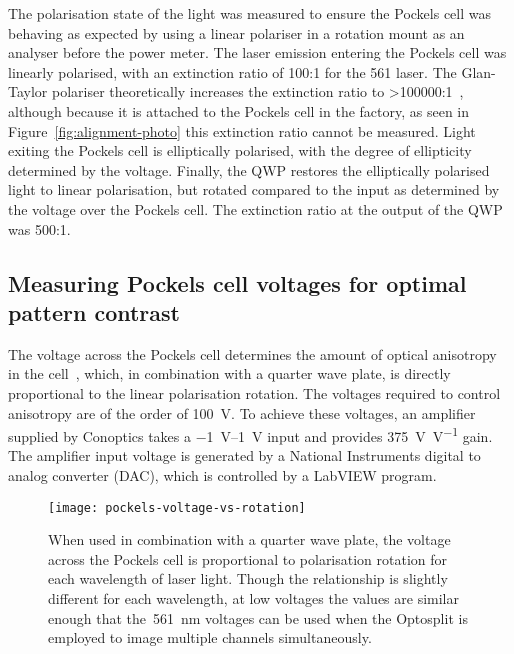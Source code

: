The polarisation state of the light was measured to ensure the Pockels cell was behaving as expected by using a linear polariser in a rotation mount as an analyser before the power meter. 
The laser emission entering the Pockels cell was linearly polarised, with an extinction ratio of 100:1 for the 561 laser. 
The Glan-Taylor polariser theoretically increases the extinction ratio to >\num{100000}:1~\cite{bennett1995handbook}, although because it is attached to the Pockels cell in the factory, as seen in Figure~\ref{fig:alignment-photo} this extinction ratio cannot be measured. 
Light exiting the Pockels cell is elliptically polarised, with the degree of ellipticity determined by the voltage. 
Finally, the QWP restores the elliptically polarised light to linear polarisation, but rotated compared to the input as determined by the voltage over the Pockels cell.
The extinction ratio at the output of the QWP was 500:1. 

\subsection{Measuring Pockels cell voltages for optimal pattern contrast}
The voltage across the Pockels cell determines the amount of optical anisotropy in the cell~\cite[\textit{ch. 8}]{hecht2017optics}, which, in combination with a quarter wave plate, is directly proportional to the linear polarisation rotation. 
The voltages required to control anisotropy are of the order of \SI{100}{\volt}. 
To achieve these voltages, an amplifier supplied by Conoptics takes a \SIrange{-1}{1}{\volt} input and provides \SI[per-mode=symbol]{375}{\volt\per\volt} gain. 
The amplifier input voltage is generated by a National Instruments digital to analog converter (DAC), which is controlled by a LabVIEW program. 

\begin{figure}[htbp!]
\centering
\texttt{[image: pockels-voltage-vs-rotation]}
\caption[LAG SIM: A Pockels cell is used to rotate the polarisation of laser light for maximum SIM pattern contrast]{When used in combination with a quarter wave plate, the voltage across the Pockels cell is proportional to polarisation rotation for each wavelength of laser light. Though the relationship is slightly different for each wavelength, at low voltages the values are similar enough that the~\SI{561}{\nano\metre} voltages can be used when the Optosplit is employed to image multiple channels simultaneously.}
\label{fig:pockels-voltage-rotation}
\end{figure}

